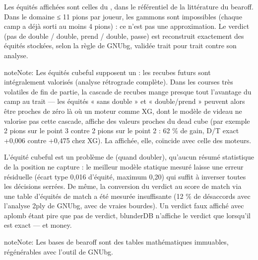 \documentclass[letterpaper,10pt,french]{sphinxmanual}
\begin{document}
\sphinxAtStartPar
{} Les équités
affichées sont celles du , dans le référentiel de
la littérature du bearoff. Dans le domaine ≤ 11 pions par joueur, les
gammons sont impossibles (chaque camp a déjà sorti au moins 4 pions) : ce
n’est pas une approximation. Le verdict (pas de double / double, prend /
double, passe) est reconstruit exactement des équités stockées, selon la
règle de GNUbg, validée trait pour trait contre son analyse.

\begin{sphinxadmonition}{note}{Note:}
\sphinxAtStartPar
Les équités cubeful supposent un  : les recubes futurs sont intégralement valorisés
(analyse rétrograde complète). Dans les courses très volatiles de fin de
partie, la cascade de recubes mange presque tout l’avantage du camp au
trait — les équités « sans double » et « double/prend » peuvent alors
être proches de zéro là où un moteur comme XG, dont le modèle de videau
ne valorise pas cette cascade, affiche des valeurs proches du dead cube
(par exemple 2 pions sur le point 3 contre 2 pions sur le point 2 :
62 \% de gain, D/T exact +0,006 contre +0,475 chez XG). La 
affichée, elle, coïncide avec celle des moteurs.
\end{sphinxadmonition}

\sphinxAtStartPar
{} L’équité cubeful est un
problème de  (quand doubler), qu’aucun résumé statistique de la
position ne capture : le meilleur modèle statique mesuré laisse une erreur
résiduelle (écart type 0,016 d’équité, maximum 0,20) qui suffit à inverser
toutes les décisions serrées. De même, la conversion du verdict au score de
match via une table d’équités de match a été mesurée insuffisante (12 \% de
désaccords avec l’analyse 2\sphinxhyphen{}ply de GNUbg, avec de vraies bourdes). Un
verdict faux affiché avec aplomb étant pire que pas de verdict, blunderDB
n’affiche le verdict que lorsqu’il est exact — et money.

\begin{sphinxadmonition}{note}{Note:}
\sphinxAtStartPar
Les bases de bearoff sont des tables mathématiques immuables,
régénérables avec l’outil  de GNUbg.
\end{sphinxadmonition}
\end{document}
